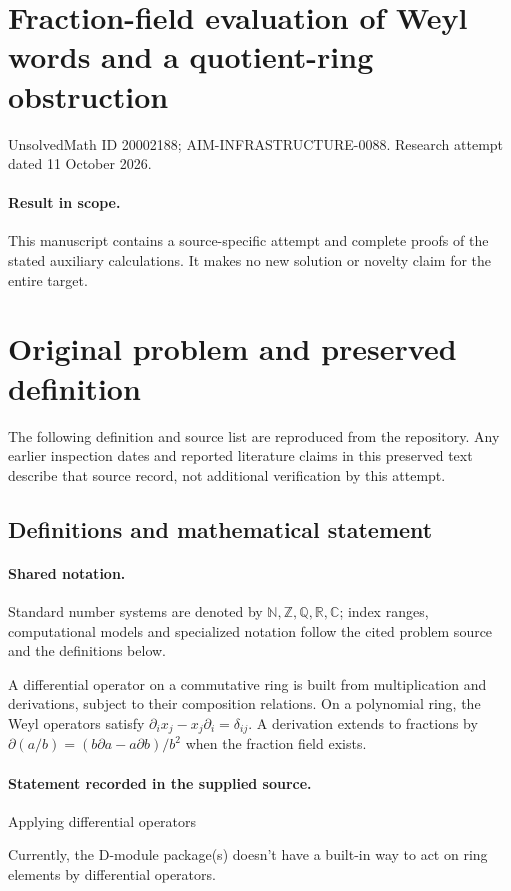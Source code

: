 \documentclass[11pt]{article}
\begin{document}
\section*{Fraction-field evaluation of Weyl words and a quotient-ring obstruction}
\noindent UnsolvedMath ID 20002188; AIM-INFRASTRUCTURE-0088. Research attempt dated 11 October 2026.
\paragraph{Result in scope.}This manuscript contains a source-specific attempt and complete proofs of the stated auxiliary calculations. It makes no new solution or novelty claim for the entire target.
\section{Original problem and preserved definition}
The following definition and source list are reproduced from the repository. Any earlier inspection dates and reported literature claims in this preserved text describe that source record, not additional verification by this attempt.
\subsection{Definitions and mathematical statement}

\paragraph{Shared notation.}Standard number systems are denoted by $\mathbb N,\mathbb Z,\mathbb Q,\mathbb R,\mathbb C$; index ranges, computational models and specialized notation follow the cited problem source and the definitions below.


A differential operator on a commutative ring is built from multiplication and derivations, subject to their composition relations. On a polynomial ring, the Weyl operators satisfy $\partial_i x_j-x_j\partial_i=\delta_{ij}$. A derivation extends to fractions by $\partial(a/b)=(b\partial a-a\partial b)/b^2$ when the fraction field exists.
\paragraph{Statement recorded in the supplied source.}
Applying differential operators

Currently, the D-module package(s) doesn't have a built-in way to act on ring elements by differential operators.
\end{document}
